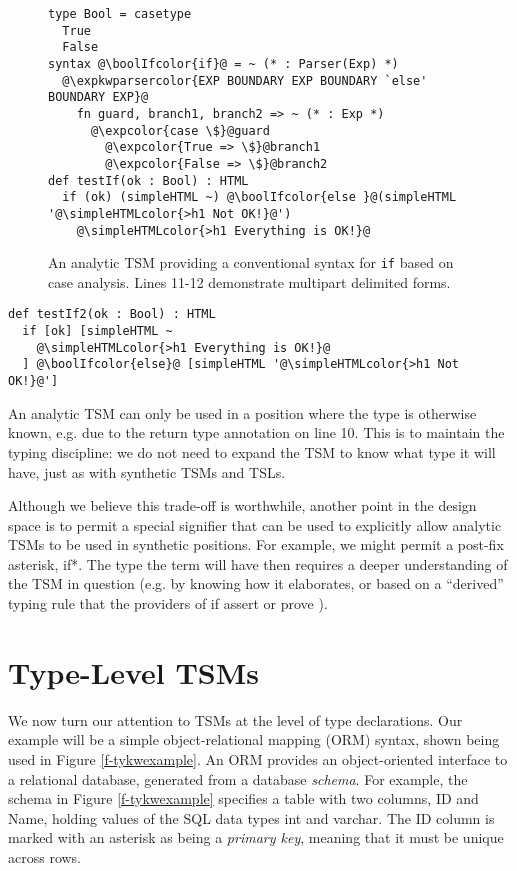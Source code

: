 \documentclass{sig-alternate}[10pt]
\makeatletter
\newcommand\BeraMonottfamily{%
  \def\fvm@Scale{0.85}%
  \fontfamily{fvm}\selectfont%
}
\newcommand{\expkwparsercolor}[1]{\textcolor[HTML]{336699}{#1}}
\newcommand{\expcolor}[1]{\textcolor[HTML]{FF0033}{#1}}
\newcommand{\simpleHTMLcolor}[1]{\textcolor[HTML]{7D5100}{#1}}
\newcommand{\boolIfcolor}[1]{\textcolor[HTML]{5E0C0C}{#1}}
\newcommand{\mycaption}[1]{\vspace{-5px}\caption{#1}\vspace{-5px}}
\newcommand{\lstinlinew}[1]{{\scriptsize\BeraMonottfamily #1}}
\makeatother
\begin{document}
\begin{figure}[t]
\begin{lstlisting}[style=wyvern]
type Bool = casetype 
  True
  False
syntax @\boolIfcolor{if}@ = ~ (* : Parser(Exp) *)
  @\expkwparsercolor{EXP BOUNDARY EXP BOUNDARY `else' BOUNDARY EXP}@
    fn guard, branch1, branch2 => ~ (* : Exp *)
      @\expcolor{case \$}@guard
        @\expcolor{True => \$}@branch1
        @\expcolor{False => \$}@branch2
def testIf(ok : Bool) : HTML
  if (ok) (simpleHTML ~) @\boolIfcolor{else }@(simpleHTML '@\simpleHTMLcolor{>h1 Not OK!}@')
    @\simpleHTMLcolor{>h1 Everything is OK!}@
\end{lstlisting}
\mycaption{An analytic TSM providing a conventional syntax for \texttt{if} based on case analysis. Lines 11-12 demonstrate multipart delimited forms.}
\label{if-example}
\end{figure}
\begin{lstlisting}[style=wyvern]
def testIf2(ok : Bool) : HTML
  if [ok] [simpleHTML ~
    @\simpleHTMLcolor{>h1 Everything is OK!}@
  ] @\boolIfcolor{else}@ [simpleHTML '@\simpleHTMLcolor{>h1 Not OK!}@']
\end{lstlisting}

An analytic TSM can only be used in a position where the type is otherwise known, e.g. due to the return type annotation on line 10. This is to maintain the typing discipline: we do not need to expand the TSM to know what type it will have, just as with synthetic TSMs and TSLs. 

Although we believe this trade-off is worthwhile, another point in the design space is to permit a special signifier that can be used to explicitly allow analytic TSMs to be used in synthetic positions. For example, we might permit a post-fix asterisk, \lstinlinew{if*}. The type the term will have then requires a deeper understanding of the TSM in question (e.g. by knowing how it elaborates, or based on a ``derived'' typing rule that the providers of \lstinlinew{if} assert or prove \cite{conf/icfp/LorenzenE13}).


\section{Type-Level TSM\lowercase{s}}\label{tsms-type}
We now turn our attention to TSMs at the level of type declarations. Our example will be a simple object-relational mapping (ORM) syntax, shown being used in Figure \ref{f-tykwexample}. An ORM provides an object-oriented interface to a relational database, generated from a database \emph{schema}. For example, the schema in Figure \ref{f-tykwexample} specifies a table with two columns, \lstinlinew{ID} and \lstinlinew{Name}, holding values of the SQL data types \lstinlinew{int} and \lstinlinew{varchar}. The \lstinlinew{ID} column is marked with an asterisk as being a \emph{primary key}, meaning that it must be unique across rows. 
\end{document}
